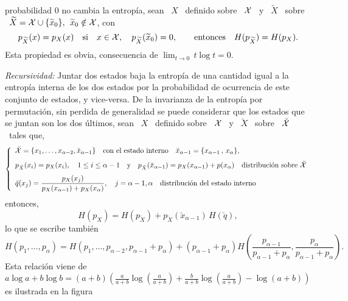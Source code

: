 \begin{propiedades}
  probabilidad 0 no cambia la entrop\'ia, \ie sean \ $X$ \ definido sobre \ $\mathcal{X}$
  \ y  \ $\widetilde{X}$ \ sobre  \ $\widetilde{X} = \mathcal{X}  \cup \{ \widetilde{x}_0
  \}, \:\: \widetilde{x}_0 \notin \mathcal{X}$, con
  \[
  p_{\widetilde{X}}(x)  =   p_X(x)  \quad  \mbox{si}  \quad  x   \in  \mathcal{X},  \quad
  p_{\widetilde{X}}(\widetilde{x}_0)   =   0,   \qquad   \mbox{entonces}   \quad
  H(p_{\widetilde{X}}) = H(p_X).
  \]
  Esta propiedad  es obvia, consecuencia de  $\displaystyle \lim_{t \to  0} \, t
  \log t = 0$.
%
\setcounter{PropRecursividad}{\value{enumi}}
\item\label{Prop:SZ:recursividad} {\it Recursividad:} Juntar dos estados baja la
  entrop\'ia de  una cantidad igual a  la entrop\'ia interna de  los dos estados
  por  la   probabilidad  de   ocurrencia  de  este   conjunto  de   estados,  y
  vice-versa. De la  invarianza de la entrop\'ia por  permutaci\'on, sin perdida
  de generalidad se  puede considerar que los estados que se  juntan son los dos
  \'ultimos, \ie sean \ $X$ \ definido  sobre \ $\mathcal{X}$ \ y \ $\breve{X}$ \ sobre
  \ $\breve{\mathcal{X}}$ \ tales que,
  \[
  \left\{  \begin{array}{l}\breve{\mathcal{X}}  = \{  x_1  ,  \ldots  , x_{\alpha-2}  ,
      \breve{x}_{\alpha-1}\} \quad \mbox{con el estado interno} \quad
      \breve{x}_{\alpha-1}   =  \{   x_{\alpha-1} \,  , \,   x_\alpha  \},\\[2.5mm]
      p_{\breve{X}}(x_i) = p_X(x_i), \quad 1 \le i \le \alpha-1 \quad \mbox{y}
      \quad p_{\breve{X}}(\breve{x}_{\alpha-1}) = p_X(x_{\alpha-1}) +
      p(x_\alpha)  \quad  \mbox{distribuci\'on  sobre  }  \breve{\mathcal{X}}\\[2.5mm]
      \displaystyle   \breve{q}(x_j)  =   \frac{p_X(x_j)}{p_X(x_{\alpha-1})  +
        p_X(x_\alpha)},  \quad j =  \alpha-1, \alpha  \quad \mbox{distribuci\'on
        del estado interno}\end{array}\right.
  \]
  entonces,
  \[
  H(p_X)  =   H(p_{\breve{X}})  +  p_{\breve{X}}(\breve{x}_{\alpha-1})  \,
  H(\breve{q}),
  \]
  lo que se escribe tambi\'en
  \[
  H(p_1,\ldots,p_\alpha)  =  H(p_1,\ldots,p_{\alpha-2},p_{\alpha-1}+p_\alpha)  +
  \left(             p_{\alpha-1}+p_\alpha            \right)            H\left(
    \frac{p_{\alpha-1}}{p_{\alpha-1}+p_\alpha}                                  ,
    \frac{p_\alpha}{p_{\alpha-1}+p_\alpha}\right).
  \]
  Esta relaci\'on  viene de $a \log  a + b  \log b = (a+b)  \left( \frac{a}{a+b}
    \log\left(  \frac{a}{a+b} \right)  + \frac{b}{a+b}  \log\left( \frac{a}{a+b}
    \right)   -   \log(  a   +   b  )\right)$   es   ilustrada   en  la   figura

\end{propiedades}
